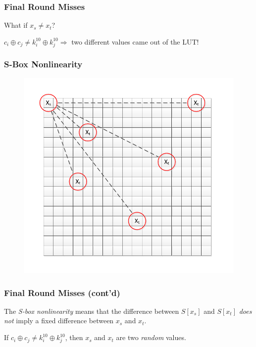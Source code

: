 \documentclass[9pt,handout]{beamer}
\begin{document}
\begin{frame}
	\frametitle{Final Round Misses}
	
	What if $x_s \not= x_t$?
	
	\bigskip 
	
	$c_i \oplus c_j \not= k_i^{10} \oplus k_j^{10} \Rightarrow$ two different values came out of the LUT!

\end{frame}

\begin{frame}
	\frametitle{S-Box Nonlinearity}
\begin{figure}
\centering
\includegraphics[scale = 0.6]{images/sboxLutDiff.pdf}
\end{figure}
\end{frame}

\begin{frame}
	\frametitle{Final Round Misses (cont'd)}
	\bigskip
	
	The \emph{S-box nonlinearity} means that the difference between $S[x_s]$ and $S[x_t]$ \emph{does not} imply a fixed difference between $x_s$ and $x_t$. 
	
	\bigskip
	
	 If $c_i \oplus c_j \not= k_i^{10} \oplus k_j^{10}$, then $x_s$ and $x_t$ are two \emph{random} values.
\end{frame}
\end{document}
